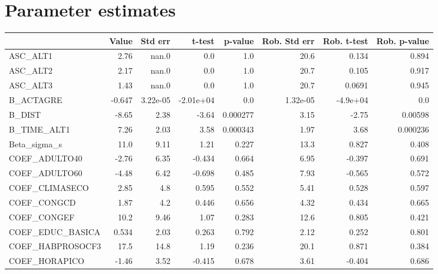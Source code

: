 \section{Parameter estimates}
\begin{tabular}{lrrrrrrr}
\toprule
{} &  Value &  Std err &    t-test &  p-value &  Rob. Std err &  Rob. t-test &  Rob. p-value \\
\midrule
ASC\_ALT1         &   2.76 &    nan.0 &       0.0 &      1.0 &          20.6 &        0.134 &         0.894 \\
ASC\_ALT2         &   2.17 &    nan.0 &       0.0 &      1.0 &          20.7 &        0.105 &         0.917 \\
ASC\_ALT3         &   1.43 &    nan.0 &       0.0 &      1.0 &          20.7 &       0.0691 &         0.945 \\
B\_ACTAGRE        & -0.647 & 3.22e-05 & -2.01e+04 &      0.0 &      1.32e-05 &     -4.9e+04 &           0.0 \\
B\_DIST           &  -8.65 &     2.38 &     -3.64 & 0.000277 &          3.15 &        -2.75 &       0.00598 \\
B\_TIME\_ALT1      &   7.26 &     2.03 &      3.58 & 0.000343 &          1.97 &         3.68 &      0.000236 \\
Beta\_sigma\_s     &   11.0 &     9.11 &      1.21 &    0.227 &          13.3 &        0.827 &         0.408 \\
COEF\_ADULTO40    &  -2.76 &     6.35 &    -0.434 &    0.664 &          6.95 &       -0.397 &         0.691 \\
COEF\_ADULTO60    &  -4.48 &     6.42 &    -0.698 &    0.485 &          7.93 &       -0.565 &         0.572 \\
COEF\_CLIMASECO   &   2.85 &      4.8 &     0.595 &    0.552 &          5.41 &        0.528 &         0.597 \\
COEF\_CONGCD      &   1.87 &      4.2 &     0.446 &    0.656 &          4.32 &        0.434 &         0.665 \\
COEF\_CONGEF      &   10.2 &     9.46 &      1.07 &    0.283 &          12.6 &        0.805 &         0.421 \\
COEF\_EDUC\_BASICA &  0.534 &     2.03 &     0.263 &    0.792 &          2.12 &        0.252 &         0.801 \\
COEF\_HABPROSOCF3 &   17.5 &     14.8 &      1.19 &    0.236 &          20.1 &        0.871 &         0.384 \\
COEF\_HORAPICO    &  -1.46 &     3.52 &    -0.415 &    0.678 &          3.61 &       -0.404 &         0.686 \\

\end{tabular}
